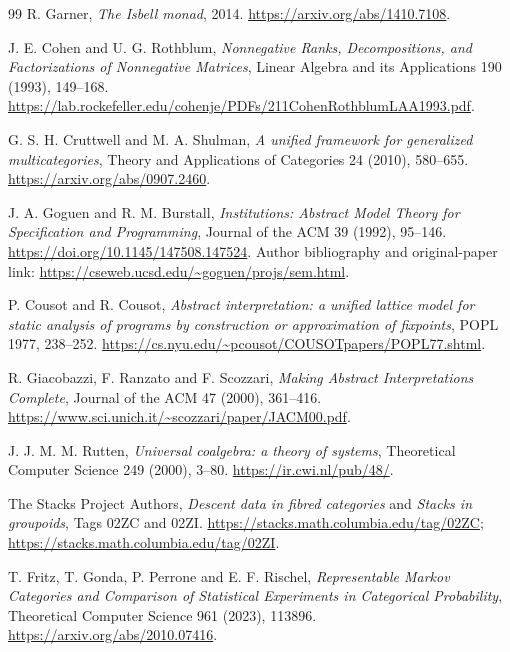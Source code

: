 \documentclass[11pt]{article}
\theoremstyle{definition}
\begin{document}
\begin{thebibliography}{99}
R. Garner, \emph{The Isbell monad}, 2014.
\url{https://arxiv.org/abs/1410.7108}.

J. E. Cohen and U. G. Rothblum,
\emph{Nonnegative Ranks, Decompositions, and Factorizations of Nonnegative Matrices},
Linear Algebra and its Applications 190 (1993), 149--168.
\url{https://lab.rockefeller.edu/cohenje/PDFs/211CohenRothblumLAA1993.pdf}.

G. S. H. Cruttwell and M. A. Shulman,
\emph{A unified framework for generalized multicategories},
Theory and Applications of Categories 24 (2010), 580--655.
\url{https://arxiv.org/abs/0907.2460}.

J. A. Goguen and R. M. Burstall,
\emph{Institutions: Abstract Model Theory for Specification and Programming},
Journal of the ACM 39 (1992), 95--146.
\url{https://doi.org/10.1145/147508.147524}.
Author bibliography and original-paper link:
\url{https://cseweb.ucsd.edu/~goguen/projs/sem.html}.

P. Cousot and R. Cousot,
\emph{Abstract interpretation: a unified lattice model for static analysis of programs by construction or approximation of fixpoints},
POPL 1977, 238--252.
\url{https://cs.nyu.edu/~pcousot/COUSOTpapers/POPL77.shtml}.

R. Giacobazzi, F. Ranzato and F. Scozzari,
\emph{Making Abstract Interpretations Complete},
Journal of the ACM 47 (2000), 361--416.
\url{https://www.sci.unich.it/~scozzari/paper/JACM00.pdf}.

J. J. M. M. Rutten, \emph{Universal coalgebra: a theory of systems},
Theoretical Computer Science 249 (2000), 3--80.
\url{https://ir.cwi.nl/pub/48/}.

The Stacks Project Authors,
\emph{Descent data in fibred categories} and \emph{Stacks in groupoids},
Tags 02ZC and 02ZI.
\url{https://stacks.math.columbia.edu/tag/02ZC};
\url{https://stacks.math.columbia.edu/tag/02ZI}.

T. Fritz, T. Gonda, P. Perrone and E. F. Rischel,
\emph{Representable Markov Categories and Comparison of Statistical Experiments in Categorical Probability},
Theoretical Computer Science 961 (2023), 113896.
\url{https://arxiv.org/abs/2010.07416}.
\end{thebibliography}
\end{document}
